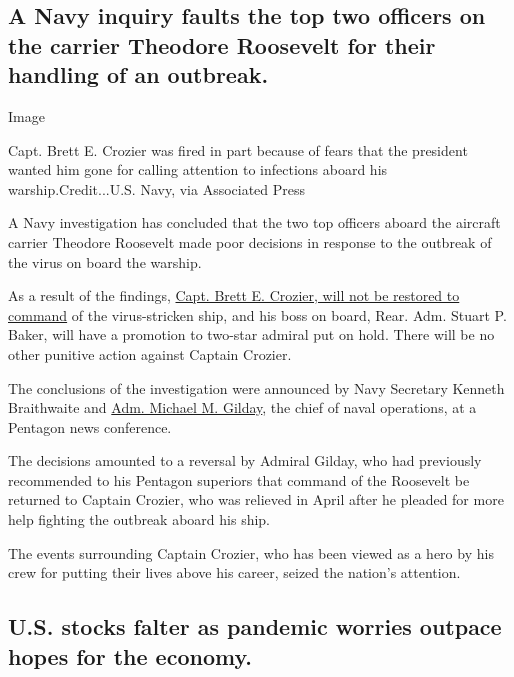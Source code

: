 \hypertarget{a-navy-inquiry-faults-the-top-two-officers-on-the-carrier-theodore-roosevelt-for-their-handling-of-an-outbreak}{%
\subsection{A Navy inquiry faults the top two officers on the carrier
Theodore Roosevelt for their handling of an
outbreak.}\label{a-navy-inquiry-faults-the-top-two-officers-on-the-carrier-theodore-roosevelt-for-their-handling-of-an-outbreak}}

Image

Capt. Brett E. Crozier was fired in part because of fears that the
president wanted him gone for calling attention to infections aboard his
warship.Credit...U.S. Navy, via Associated Press

A Navy investigation has concluded that the two top officers aboard the
aircraft carrier Theodore Roosevelt made poor decisions in response to
the outbreak of the virus on board the warship.

As a result of the findings,
\href{https://www.nytimes3xbfgragh.onion/2020/06/19/us/politics/carrier-roosevelt-coronavirus-crozier.html}{Capt.
Brett E. Crozier, will not be restored to command} of the virus-stricken
ship, and his boss on board, Rear. Adm. Stuart P. Baker, will have a
promotion to two-star admiral put on hold. There will be no other
punitive action against Captain Crozier.

The conclusions of the investigation were announced by Navy Secretary
Kenneth Braithwaite and
\href{https://www.nytimes3xbfgragh.onion/2020/05/01/us/politics/coronavirus-carrier-crozier-gilday-trump.html}{Adm.
Michael M. Gilday}, the chief of naval operations, at a Pentagon news
conference.

The decisions amounted to a reversal by Admiral Gilday, who had
previously recommended to his Pentagon superiors that command of the
Roosevelt be returned to Captain Crozier, who was relieved in April
after he pleaded for more help fighting the outbreak aboard his ship.

The events surrounding Captain Crozier, who has been viewed as a hero by
his crew for putting their lives above his career, seized the nation's
attention.

\hypertarget{us-stocks-falter-as-pandemic-worries-outpace-hopes-for-the-economy}{%
\subsection{U.S. stocks falter as pandemic worries outpace hopes for the
economy.}\label{us-stocks-falter-as-pandemic-worries-outpace-hopes-for-the-economy}}


